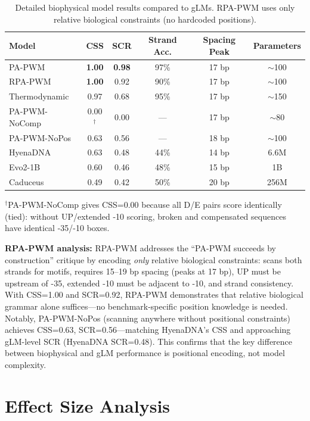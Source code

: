 \documentclass{article}
\begin{document}
\begin{table}[H]
\caption{Detailed biophysical model results compared to gLMs. RPA-PWM uses only relative biological constraints (no hardcoded positions).}
\label{tab:biophysical_full}
\begin{center}
\small
\begin{tabular}{lccccc}
\toprule
Model & CSS & SCR & Strand Acc. & Spacing Peak & Parameters \\
\midrule
PA-PWM & \textbf{1.00} & \textbf{0.98} & 97\% & 17 bp & $\sim$100 \\
RPA-PWM & \textbf{1.00} & 0.92 & 90\% & 17 bp & $\sim$100 \\
Thermodynamic & 0.97 & 0.68 & 95\% & 17 bp & $\sim$150 \\
\midrule
PA-PWM-NoComp & 0.00$^\dagger$ & 0.00 & --- & 17 bp & $\sim$80 \\
PA-PWM-NoPos & 0.63 & 0.56 & --- & 18 bp & $\sim$100 \\
\midrule
HyenaDNA & 0.63 & 0.48 & 44\% & 14 bp & 6.6M \\
Evo2-1B & 0.60 & 0.46 & 48\% & 15 bp & 1B \\
Caduceus & 0.49 & 0.42 & 50\% & 20 bp & 256M \\
\bottomrule
\end{tabular}
\end{center}
\vskip -0.05in
{\footnotesize $^\dagger$PA-PWM-NoComp gives CSS=0.00 because all D/E pairs score identically (tied): without UP/extended -10 scoring, broken and compensated sequences have identical -35/-10 boxes.}
\end{table}

\textbf{RPA-PWM analysis:} RPA-PWM addresses the ``PA-PWM succeeds by construction'' critique by encoding \textit{only} relative biological constraints: scans both strands for motifs, requires 15--19 bp spacing (peaks at 17 bp), UP must be upstream of -35, extended -10 must be adjacent to -10, and strand consistency. With CSS=1.00 and SCR=0.92, RPA-PWM demonstrates that relative biological grammar alone suffices---no benchmark-specific position knowledge is needed. Notably, PA-PWM-NoPos (scanning anywhere without positional constraints) achieves CSS=0.63, SCR=0.56---matching HyenaDNA's CSS and approaching gLM-level SCR (HyenaDNA SCR=0.48). This confirms that the key difference between biophysical and gLM performance is positional encoding, not model complexity.

\section{Effect Size Analysis}
\label{app:effects}
\end{document}
